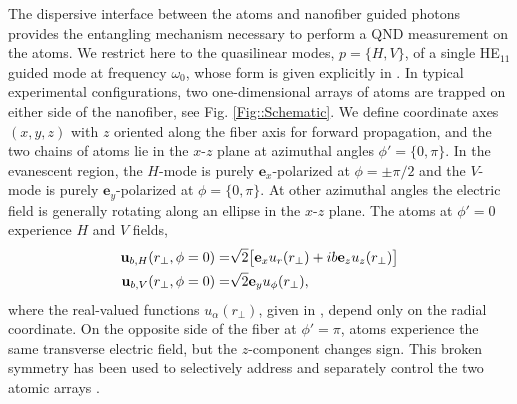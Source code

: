 \documentclass[preprint, aps,pra,onecolumn]{revtex4-1} %
\begin{document}
The dispersive interface between the atoms and nanofiber guided photons provides the entangling mechanism necessary to perform a QND measurement on the atoms.  
We restrict here to the quasilinear modes, $p =\{H,V\}$, of a single HE$_{11}$ guided mode at frequency $\omega_0$, whose form is given explicitly in .  
In typical experimental configurations, two one-dimensional arrays of atoms are trapped on either side of the nanofiber, see Fig. \ref{Fig::Schematic}. 
We define coordinate axes $(x,y,z)$ with $z$ oriented along the fiber axis for forward propagation, and the two chains of atoms lie in the $x$-$z$ plane at azimuthal angles $\phi' = \{0, \pi\}$.
In the evanescent region, the $H$-mode is purely $\mathbf{e}_x$-polarized at $\phi = \pm \pi/2$ and the $V$-mode is purely $\mathbf{e}_y$-polarized at $\phi = \{0,\pi\}$.  
At other azimuthal angles the electric field is generally rotating along an ellipse in the $x$-$z$ plane.  The atoms at $\phi'=0$ experience $H$ and $V$ fields,
\begin{subequations}
	\begin{align}
		\mathbf{u}_{b,H}(r_\perp, \phi = 0) = & \sqrt{2} \big[ \mathbf{e}_x u_r(r_\perp)+  i b \mathbf{e}_z  u_z(r_\perp) \big] \\
		\mathbf{u}_{b,V}(r_\perp, \phi = 0) = & \sqrt{2} \mathbf{e}_y u_\phi(r_\perp), 
	\end{align}
\end{subequations}
where the real-valued functions $u_\alpha(r_\perp)$, given in , depend only on the radial coordinate.  
On the opposite side of the fiber at $\phi' = \pi$, atoms experience the same transverse electric field, but the $z$-component changes sign.   This broken symmetry has been used to selectively address and separately control the two atomic arrays \cite{mitsch_exploiting_2014, mitsch_quantum_2014, sayrin_storage_2015}.  
\end{document}
